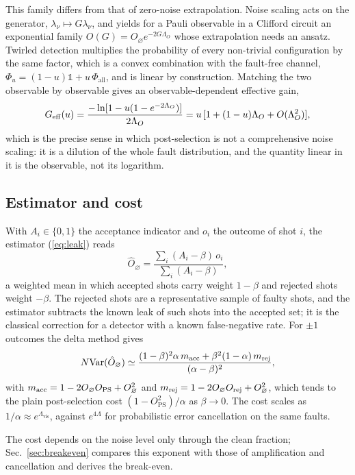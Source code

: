 \documentclass[11pt,a4paper]{article}
\theoremstyle{remark}
\newcommand{\Var}{\mathrm{Var}}
\newcommand{\PS}{\mathrm{PS}}
\newcommand{\all}{\mathrm{all}}
\newcommand{\id}{\mathbb{1}}
\newcommand{\vis}{\mathrm{vis}}
\begin{document}
This family differs from that of zero-noise extrapolation. Noise scaling acts on the generator, $\lambda_\nu\mapsto G\lambda_\nu$, and yields for a Pauli observable in a Clifford circuit an exponential family $O(G)=O_\varnothing e^{-2G\Lambda_O}$ whose extrapolation needs an ansatz. Twirled detection multiplies the probability of every non-trivial configuration by the same factor, which is a convex combination with the fault-free channel, $\Phi_u=(1-u)\id+u\,\Phi_\all$, and is linear by construction. Matching the two observable by observable gives an observable-dependent effective gain,
\begin{equation}
G_{\rm eff}(u)=\frac{-\ln[1-u(1-e^{-2\Lambda_O})]}{2\Lambda_O}=u\,[1+(1-u)\Lambda_O+O(\Lambda_O^2)],
\end{equation}
which is the precise sense in which post-selection is not a comprehensive noise scaling: it is a dilution of the whole fault distribution, and the quantity linear in it is the observable, not its logarithm.

\subsection{Estimator and cost}
\label{sec:cost}

With $A_i\in\{0,1\}$ the acceptance indicator and $o_i$ the outcome of shot $i$, the estimator (\ref{eq:leak}) reads
\begin{equation}
\hat O_\varnothing=\frac{\sum_i(A_i-\beta)\,o_i}{\sum_i(A_i-\beta)},
\end{equation}
a weighted mean in which accepted shots carry weight $1-\beta$ and rejected shots weight $-\beta$. The rejected shots are a representative sample of faulty shots, and the estimator subtracts the known leak of such shots into the accepted set; it is the classical correction for a detector with a known false-negative rate. For $\pm1$ outcomes the delta method gives
\begin{equation}
N\Var(\hat O_\varnothing)\simeq\frac{(1-\beta)^2\alpha\,m_{\rm acc}+\beta^2(1-\alpha)\,m_{\rm rej}}{(\alpha-\beta)^2},
\label{eq:var}
\end{equation}
with $m_{\rm acc}=1-2O_\varnothing O_\PS+O_\varnothing^2$ and $m_{\rm rej}=1-2O_\varnothing O_{\rm rej}+O_\varnothing^2$,
which tends to the plain post-selection cost $(1-O_\PS^2)/\alpha$ as $\beta\to0$. The cost scales as $1/\alpha\approx e^{\Lambda_\vis}$, against $e^{4\Lambda}$ for probabilistic error cancellation on the same faults.

The cost depends on the noise level only through the clean fraction; Sec.~\ref{sec:breakeven} compares this exponent with those of amplification and cancellation and derives the break-even.
\end{document}
